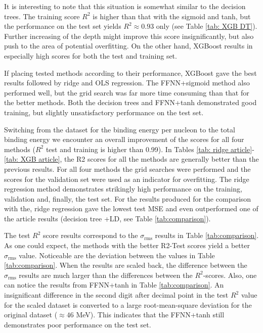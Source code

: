 \documentclass[numberedappendix, twocolappendix]{emulateapj}
\begin{document}
It is interesting to note that this situation is somewhat similar to the decision trees. The training score $R^2$ is higher than that with the sigmoid and tanh, but the performance on the test set yields $R^2\approx 0.93$ only (see Table \ref{tab: XGB DT}). Further increasing of the depth might improve this score insignificantly, but also push to the area of potential overfitting. On the other hand, XGBoost results in especially high scores for both the test and training set.


If placing tested methods according to their performance, XGBoost gave the best results followed by ridge and OLS regression. The FFNN+sigmoid method also performed well, but the grid search was far more time consuming than that for the better methods. Both the decision trees and FFNN+tanh demonstrated good training, but slightly unsatisfactory performance on the test set.


Switching from the dataset for the binding energy per nucleon to the total binding energy we encounter an overall improvement of the scores for all four methods ($R^2$ test and training is higher than 0.99). In Tables \ref{tab: ridge article}-\ref{tab: XGB article}, the R2 scores for all the methods are generally better than the previous results. For all four methods the grid searches were performed and the scores for the validation set were used as an indicator for overfitting. The ridge regression method demonstrates strikingly high performance on the training, validation and, finally, the test set. For the results produced for the comparison with the, ridge regression gave the lowest test MSE and even outperformed one of the article results (decision tree +LD, see Table \ref{tab:comparison}). 

The test $R^2$ score results correspond to the $\sigma_{\mathrm{rms}}$ results in Table \ref{tab:comparison}. As one could expect, the methods with the better R2-Test scores yield a better $\sigma_{\mathrm{rms}}$ value. Noticeable are the deviation between the values in Table \ref{tab:comparison}. When the results are scaled back, the difference between the $\sigma_{\mathrm{rms}}$ results are much larger than the differences between the $R^2$-scores. Also, one can notice the results from FFNN+tanh in Table \ref{tab:comparison}. An insignificant difference in the second digit after decimal point in the test $R^2$ value for the scaled dataset is converted to a large root-mean-square deviation for the original dataset ($\approx 46$ MeV). This indicates that the FFNN+tanh still demonstrates poor performance on the test set. 
\end{document}
